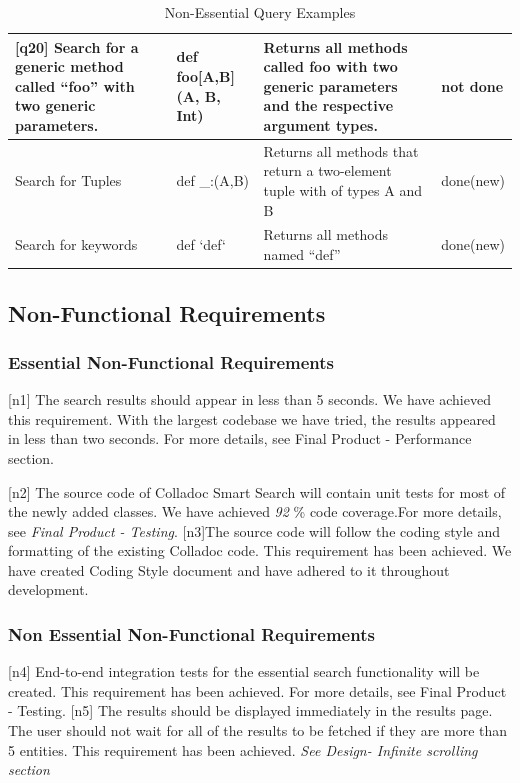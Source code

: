 \begin{table}[htbp]
\begin{center}
\begin{tabular}{|p{1.4in}|p{1.2in}|p{1.3in}|p{0.5in}|}
[q20] Search for a generic method called ``foo'' with two generic parameters. & def foo[A,B](A, B, Int) & Returns all methods called foo with two generic parameters and the respective argument types. & not done \\ \hline 
[q21] Search for Tuples & def \_:(A,B) & Returns all methods that return a two-element tuple with of types A and B & done\newline (new) \\ \hline 
[q22] Search for keywords & def `def` & Returns all methods named ``def'' & done\newline (new) \\ \hline 
\end{tabular}
\caption{Non-Essential Query Examples}
\label{non_essential_query_examples}
\end{center}
\end{table}

\subsection{Non-Functional Requirements}

\subsubsection{Essential Non-Functional Requirements}


[n1] The search results should appear in less than 5 seconds. 
We have achieved this requirement. With the largest codebase we have tried, the results appeared in less than two seconds. For more details, see Final Product - Performance section.

[n2] The source code of Colladoc Smart Search will contain unit tests for most of the newly added classes.
We have achieved \emph{\color{red}92} \% code coverage.For more details, see \emph{\color{red} Final Product - Testing}.
[n3]The source code will follow the coding style and formatting of the existing Colladoc code.
This requirement has been achieved. We have created Coding Style document \cite{coding-style} and have adhered to it throughout development. 

\subsubsection{Non Essential Non-Functional Requirements}

[n4] End-to-end integration tests for the essential search functionality will be created.
This requirement has been achieved. For more details, see Final Product - Testing.
[n5] The results should be displayed immediately in the results page. The user should not wait for all of the results to be fetched if they are more than 5 entities.
This requirement has been achieved. \emph{\color{red} See Design- Infinite scrolling section}
